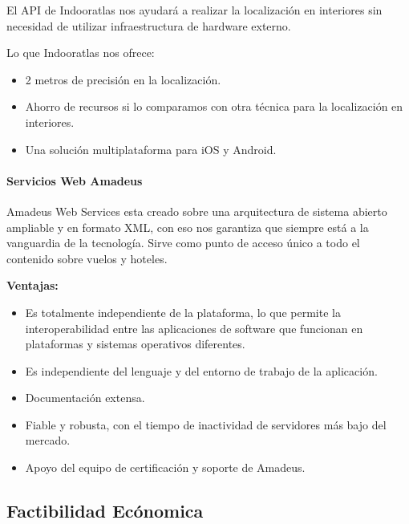 El API de Indooratlas nos ayudará a realizar la localización en interiores sin necesidad de utilizar infraestructura de hardware externo. \cite{apiIndoorAtlas}

Lo que Indooratlas nos ofrece:

\begin{itemize}
	\item 2 metros de precisión en la localización.
	\item	Ahorro de recursos si lo comparamos con otra técnica para la localización en interiores.
	\item Una solución multiplataforma para iOS y Android.
\end{itemize}

\paragraph{Servicios Web Amadeus}
 
Amadeus Web Services esta creado sobre una arquitectura de sistema abierto ampliable y en formato XML, con eso nos garantiza que siempre está a la vanguardia de la tecnología. Sirve como punto de acceso único a todo el contenido sobre vuelos y hoteles.
  
\textbf{Ventajas:}
\begin{itemize}
	\item Es totalmente independiente de la plataforma, lo que permite la interoperabilidad entre las aplicaciones de software que funcionan en plataformas y sistemas operativos diferentes.
	\item Es independiente del lenguaje y del entorno de trabajo de la aplicación.
	\item 	Documentación extensa.
	\item Fiable y robusta, con el tiempo de inactividad de servidores más bajo del mercado.
	\item Apoyo del equipo de certificación y soporte de Amadeus.
\end{itemize}

\subsection{Factibilidad Ecónomica}

